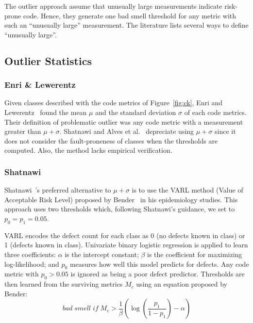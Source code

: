 \documentclass[twocolumn,5p]{elsarticle}
\newcommand{\fig}[1]{Figure~\ref{fig:#1}}
\theoremstyle{break}
\begin{document}
The outlier approach assume that unusually large measurements indicate risk-prone code.
Hence, they generate one bad smell threshold for any metric
with such an ``unusually large'' measurement. 
The literature lists several ways to define ``unusually large''.



\subsection{Outlier Statistics}

\subsubsection{Enri \& Lewerentz}
Given classes described with the  code metrics of \fig{ck},
Enri and Lewerentz~\cite{erni96} found the   mean $\mu$ and the standard deviation $\sigma$
of each
code metrics. Their definition of problematic outlier was any code
metric with a measurement greater than $\mu+\sigma$.
Shatnawi and Alves et al.~\cite{Shatnawi10,Alves2010} depreciate
using $\mu+\sigma$ since it does not consider the fault-proneness of classes when the thresholds are computed. Also, the method lacks  empirical verification.

\subsubsection{ Shatnawi}
Shatnawi~\cite{Shatnawi10}'s preferred alternative to $\mu+\sigma$
is to use the VARL method (Value of Acceptable Risk Level) proposed by Bender~\cite{bender99} in his epidemiology studies.  This approach uses two
thresholds which, following Shatnawi's guidance, we set to
$p_0=p_1=0.05$. 

VARL encodes the defect count
for each class as 0 (no defects known in class) or 1 (defects known in class).
Univariate binary logistic regression is applied to learn three coefficients:  
 $\alpha$ is the intercept constant;
    $\beta$ is the coefficient for maximizing log-likelihood;
  and $p_0$  
    measures   how well this   model predicts for   defects.
Any code metric with $p_0>0.05$ is  ignored as being a poor defect predictor. Thresholds are then learned from the surviving metrics $M_c$ using
an equation proposed by Bender:
\begin{equation}
 \mathit{bad\; smell\; if\;} M_c > \frac{1}{\beta }\left( {\log \left( {\frac{{{p_1}}}{{1 - {p_1}}}} \right) - \alpha } \right) 
\end{equation}
\end{document}

